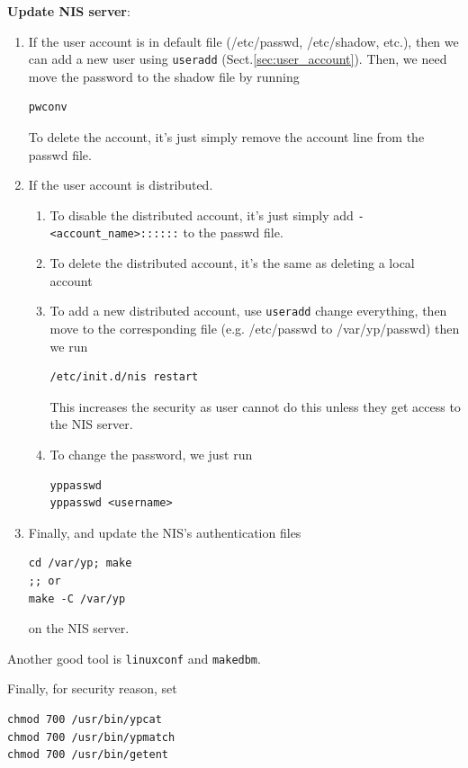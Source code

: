 {\bf Update NIS server}: 
\begin{enumerate}
  \item If the user account is in default file (/etc/passwd,
/etc/shadow, etc.), then we can add a new user using \verb!useradd!
(Sect.\ref{sec:user_account}). Then, we need move the password to the shadow file
by running 
\begin{verbatim}
pwconv
\end{verbatim}
To delete the account, it's just simply remove the account line from the passwd
file. 
  
  \item If the user account is distributed.
  \begin{enumerate}
    \item  To disable the distributed account, it's just simply add
\verb!-<account_name>::::::! to the passwd file.
    \item To delete the distributed account, it's the same as deleting a local   
    account
    \item To add a new distributed account, use \verb!useradd! change
    everything, then move to the corresponding file (e.g. /etc/passwd to
    /var/yp/passwd) then we run 
\begin{verbatim}
/etc/init.d/nis restart
\end{verbatim}    
This increases the security as user cannot do this unless they get access to the NIS server.

   \item To change the password, we just run 
\begin{verbatim}
yppasswd 
yppasswd <username>
\end{verbatim}

   \end{enumerate}
   
   \item Finally, and update the NIS's authentication files
\begin{verbatim}
cd /var/yp; make
;; or
make -C /var/yp
\end{verbatim}
on the NIS server. 
   
\end{enumerate}


Another good tool is \verb!linuxconf! and  \verb!makedbm!.  

Finally, for security reason, set 
\begin{verbatim}
chmod 700 /usr/bin/ypcat
chmod 700 /usr/bin/ypmatch
chmod 700 /usr/bin/getent
\end{verbatim}


